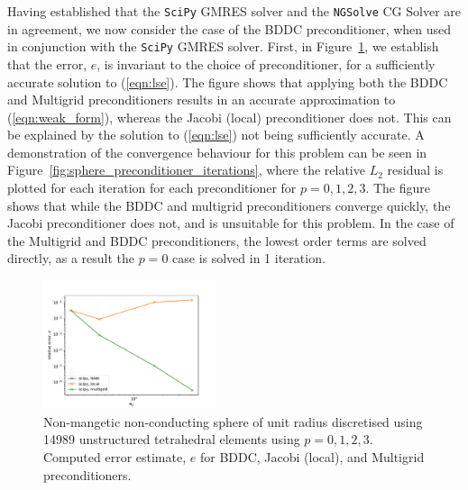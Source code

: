 \documentclass[a4paper,12]{elsarticle}
\theoremstyle{definition}
\begin{document}
Having established that the \texttt{SciPy} GMRES solver and the \texttt{NGSolve} CG Solver are in agreement, we now consider the case of the BDDC preconditioner, when used in conjunction with the \texttt{SciPy} GMRES solver. First, in Figure~\ref{fig:sphere_preconditioner_comparison}, we establish that the error, $e$, is invariant to the choice of preconditioner, for a sufficiently accurate solution to (\ref{eqn:lse}). The figure shows that applying both the BDDC and Multigrid preconditioners results in an accurate approximation to (\ref{eqn:weak_form}), whereas the Jacobi (local) preconditioner does not. This can be explained by the solution to (\ref{eqn:lse}) not being sufficiently accurate. A demonstration of the convergence behaviour for this problem can be seen in Figure~\ref{fig:sphere_preconditioner_iterations}, where the relative $L_2$ residual is plotted for each iteration for each preconditioner for $p=0,1,2,3$. The figure shows that while the BDDC and multigrid preconditioners converge quickly, the Jacobi preconditioner does not, and is unsuitable for this problem. In the case of the Multigrid and BDDC preconditioners, the lowest order terms are solved directly, as a result the $p=0$ case is solved in 1 iteration.    

\begin{figure}[htb]
\centering
\includegraphics[width=0.45\textwidth]{Sphere_p_ref_preconditioner_comparison}
\caption{Non-mangetic non-conducting sphere of unit radius discretised using 14989 unstructured tetrahedral elements using $p=0,1,2,3$. Computed error estimate, $e$ for BDDC, Jacobi (local), and Multigrid preconditioners.}
\label{fig:sphere_preconditioner_comparison}
\end{figure}
\end{document}
